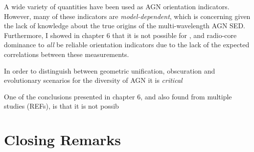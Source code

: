 A wide variety of quantities have been used as AGN orientation
indicators. However, many of these indicators are {\em model-dependent},
which is concerning given the lack of knowledge about the true
origins of the multi-wavelength AGN SED. Furthermore, I showed in
chapter 6 that it is not possible for \ewo, \fwh and radio-core 
dominance to {\em all} be reliable orientation indicators due to
the lack of the expected correlations between these measurements.

In order to distinguish between geometric unification, obscuration 
and evolutionary scenarios for the diversity of AGN it is 
{\em critical}

One of the conclusions presented in chapter 6, and also found
from multiple studies (REFs), is that it is not possib


\section{Closing Remarks}












